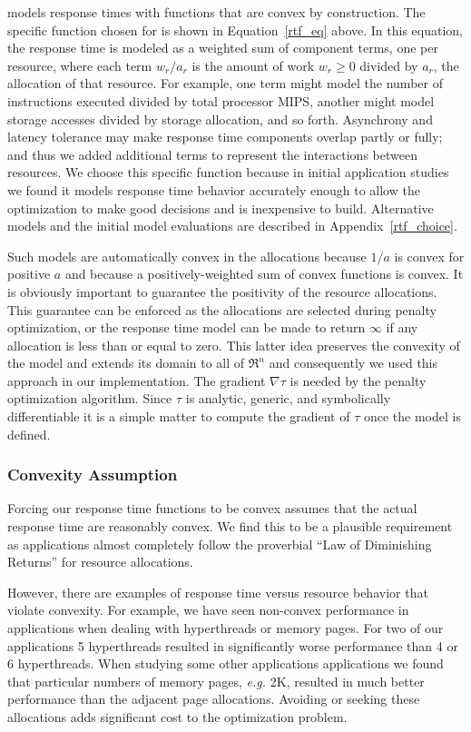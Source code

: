 \pacora models response times with functions that are convex by construction.  The specific function chosen for \pacora is shown in Equation~\ref{rtf_eq} above.  In this equation, the response time is modeled as a weighted sum of component terms, one per resource, where each term $w_r/a_r$ is the amount of work $w_r \geq 0$ divided by $a_r$, the allocation of that resource\cite{Snav}. For example, one term might model the number of instructions executed divided by total processor MIPS, another might model storage accesses divided by storage allocation, and so forth. Asynchrony and latency tolerance may make response time components overlap partly or fully; and thus we added additional terms to represent the interactions between resources. We choose this specific function because in initial application studies we found it models response time behavior accurately enough to allow the optimization to make good decisions and is inexpensive to build.  Alternative models and the initial model evaluations are described in Appendix~\ref{rtf_choice}.

Such models are automatically convex in the allocations because $1/a$ is convex for positive $a$ and because a positively-weighted sum of convex functions is convex.  It is obviously important to guarantee the positivity of the resource allocations. This guarantee can be enforced as the allocations are selected during penalty optimization, or the response time model can be made to return $\infty$ if any allocation is less than or equal to zero. This latter idea preserves the convexity of the model and extends its domain to all of $\Re^n$ and consequently we used this approach in our implementation. The gradient $\nabla\tau$ is needed by the penalty optimization algorithm.
Since $\tau$ is analytic, generic, and symbolically differentiable
it is a simple matter to compute the gradient of $\tau$ once the model is defined.

\subsubsection*{Convexity Assumption} Forcing our response time functions to be convex assumes that the actual response time are reasonably convex. We find this to be a plausible requirement as applications almost completely follow the proverbial ``Law of Diminishing Returns'' for resource allocations.

However, there are examples of response time versus resource behavior that violate convexity.   For example, we have seen non-convex performance in applications when dealing with hyperthreads or memory pages.  For two of our applications 5 hyperthreads resulted in significantly worse performance than 4 or 6 hyperthreads.  When studying some other applications applications we found that particular numbers of memory pages, \emph{e.g.} 2K, resulted in much better performance than the adjacent page allocations.  Avoiding or seeking these allocations adds significant cost to the optimization problem.

